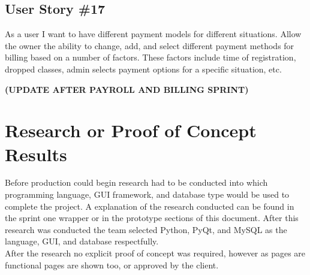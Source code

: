 \subsection{User Story \#17}
As a user I want to have different payment models for different situations. Allow the owner the ability to change, add, and select different payment methods for billing based on a number of factors. These factors include time of registration, dropped classes, admin selects payment options for a specific situation, etc.

\bf(UPDATE AFTER PAYROLL AND BILLING SPRINT)

\section{Research or Proof of Concept Results}
Before production could begin research had to be conducted into which programming language, GUI framework, and database type would be used to complete the project. A explanation of the research conducted can be found in the sprint one wrapper or in the prototype sections of this document. After this research was conducted the team selected Python, PyQt, and MySQL as the language, GUI, and database respectfully.\\
After the research no explicit proof of concept was required, however as pages are functional pages are shown too, or approved by the client.

